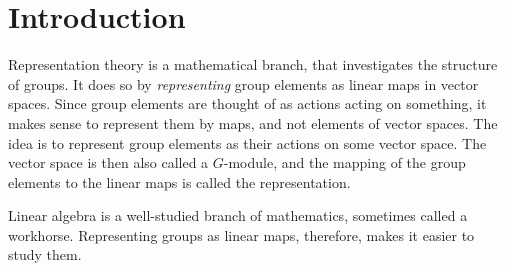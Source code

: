 \section{Introduction}

Representation theory is a mathematical branch, that investigates the structure of groups.
It does so by \textit{representing} group elements as linear maps in vector spaces.
Since group elements are thought of as actions acting on something, it makes sense to represent them by maps, and not elements of vector spaces.
The idea is to represent group elements as their actions on some vector space.
The vector space is then also called a $G$-module, and the mapping of the group elements to the linear maps is called the representation.

Linear algebra is a well-studied branch of mathematics, sometimes called a workhorse.
Representing groups as linear maps, therefore, makes it easier to study them.
